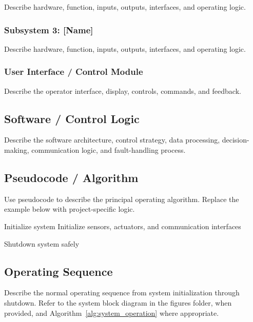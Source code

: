 Describe hardware, function, inputs, outputs, interfaces, and operating logic.

\subsubsection{Subsystem 3: [Name]}

Describe hardware, function, inputs, outputs, interfaces, and operating logic.

\subsubsection{User Interface / Control Module}

Describe the operator interface, display, controls, commands, and feedback.

\subsection{Software / Control Logic}

Describe the software architecture, control strategy, data processing,
decision-making, communication logic, and fault-handling process.

\subsection{Pseudocode / Algorithm}

Use pseudocode to describe the principal operating algorithm. Replace the
example below with project-specific logic.

\begin{algorithm}[H]
\caption{System Operating Algorithm}
\label{alg:system_operation}


Initialize system\;
Initialize sensors, actuators, and communication interfaces\;


Shutdown system safely\;

\end{algorithm}

\subsection{Operating Sequence}

Describe the normal operating sequence from system initialization through
shutdown. Refer to the system block diagram in the figures folder, when
provided, and Algorithm~\ref{alg:system_operation} where appropriate.

